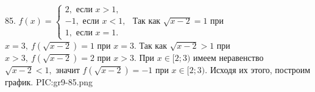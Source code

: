 85. $f(x)=\begin{cases} 2, \text{ если } x>1,\\ -1, \text{ если } x<1,\\ 1, \text{ если } x=1.\end{cases}$
Так как $\sqrt{x-2}=1$ при $x=3,\ f(\sqrt{x-2})=1$ при $x=3.$ Так как $\sqrt{x-2}>1$ при $x>3,\ f(\sqrt{x-2})=2$ при $x>3.$ При $x\in[2;3)$ имеем неравенство
$\sqrt{x-2}<1,$ значит $f(\sqrt{x-2})=-1$ при $x\in[2;3).$ Исходя их этого, построим график.
{{PIC:gr9-85.png}}\\
